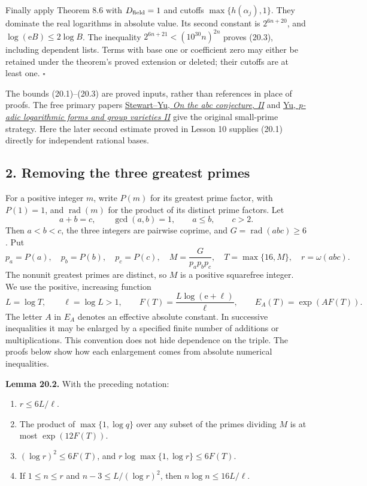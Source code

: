 \documentclass[
  11pt,
  a4paper,
]{article}
\providecommand{\tightlist}{%
  \setlength{\itemsep}{0pt}\setlength{\parskip}{0pt}}
\begin{document}
Finally apply Theorem 8.6 with \(D_{\rm field}=1\) and cutoffs
\(\max\{h(\alpha_j),1\}\). They dominate the real logarithms in absolute
value. Its second constant is \(2^{6n+20}\), and
\(\log(\mathrm eB)\le2\log B\). The inequality
\(2^{6n+21}<(10^{30}n)^{2n}\) proves (20.3), including dependent lists.
Terms with base one or coefficient zero may either be retained under the
theorem's proved extension or deleted; their cutoffs are at least one.
\(\square\)

The bounds (20.1)--(20.3) are proved inputs, rather than references in
place of proofs. The free primary papers
\href{https://uwaterloo.ca/pure-mathematics/sites/default/files/uploads/documents/s0012-7094-01-10815-6.pdf}{Stewart--Yu,
\emph{On the abc conjecture, II}} and
\href{https://matwbn.icm.edu.pl/ksiazki/aa/aa89/aa8944.pdf}{Yu,
\emph{p-adic logarithmic forms and group varieties II}} give the
original small-prime strategy. Here the later second estimate proved in
Lesson 10 supplies (20.1) directly for independent rational bases.

\subsection{2. Removing the three greatest
primes}\label{removing-the-three-greatest-primes}

For a positive integer \(m\), write \(P(m)\) for its greatest prime
factor, with \(P(1)=1\), and \(\operatorname{rad}(m)\) for the product
of its distinct prime factors. Let \[
 a+b=c,\qquad \gcd(a,b)=1,\qquad a\le b,\qquad c>2.
 \tag{20.8}
\] Then \(a<b<c\), the three integers are pairwise coprime, and
\(G=\operatorname{rad}(abc)\ge6\). Put \[
 p_a=P(a),\quad p_b=P(b),\quad p_c=P(c),\quad
 M=\frac G{p_ap_bp_c},\quad T=\max\{16,M\},\quad r=\omega(abc).
 \tag{20.9}
\] The nonunit greatest primes are distinct, so \(M\) is a positive
squarefree integer. We use the positive, increasing function \[
 L=\log T,\qquad \ell=\log L>1,\qquad
 F(T)=\frac{L\log(\mathrm e+\ell)}{\ell},\qquad
 E_A(T)=\exp(AF(T)).
 \tag{20.10}
\] The letter \(A\) in \(E_A\) denotes an effective absolute constant.
In successive inequalities it may be enlarged by a specified finite
number of additions or multiplications. This convention does not hide
dependence on the triple. The proofs below show how each enlargement
comes from absolute numerical inequalities.

\textbf{Lemma 20.2.} With the preceding notation:

\begin{enumerate}
\def\labelenumi{\arabic{enumi}.}
\tightlist
\item
  \(r\le6L/\ell\).
\item
  The product of \(\max\{1,\log q\}\) over any subset of the primes
  dividing \(M\) is at most \(\exp(12F(T))\).
\item
  \((\log r)^2\le6F(T)\), and \(r\log\max\{1,\log r\}\le6F(T)\).
\item
  If \(1\le n\le r\) and \(n-3\le L/(\log r)^2\), then
  \(n\log n\le16L/\ell\).
\end{enumerate}
\end{document}
